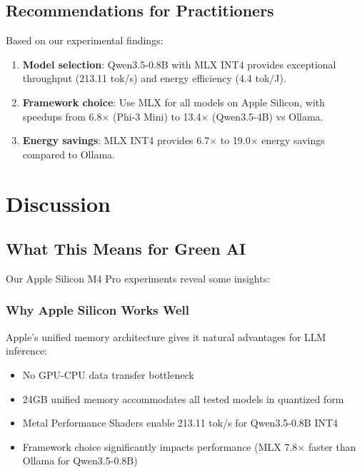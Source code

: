 \documentclass[conference]{IEEEtran}
\begin{document}
\subsection{Recommendations for Practitioners}

Based on our experimental findings:

\begin{enumerate}[leftmargin=*,nosep]
    \item \textbf{Model selection}: Qwen3.5-0.8B with MLX INT4 provides exceptional throughput (213.11 tok/s) and energy efficiency (4.4 tok/J).

    \item \textbf{Framework choice}: Use MLX for all models on Apple Silicon, with speedups from 6.8$\times$ (Phi-3 Mini) to 13.4$\times$ (Qwen3.5-4B) vs Ollama.

    \item \textbf{Energy savings}: MLX INT4 provides 6.7$\times$ to 19.0$\times$ energy savings compared to Ollama.
\end{enumerate}

\section{Discussion}

\subsection{What This Means for Green AI}

Our Apple Silicon M4 Pro experiments reveal some insights:

\subsubsection{Why Apple Silicon Works Well}

Apple's unified memory architecture gives it natural advantages for LLM inference:

\begin{itemize}[leftmargin=*,nosep]
    \item No GPU-CPU data transfer bottleneck
    \item 24GB unified memory accommodates all tested models in quantized form
    \item Metal Performance Shaders enable 213.11 tok/s for Qwen3.5-0.8B INT4
    \item Framework choice significantly impacts performance (MLX 7.8$\times$ faster than Ollama for Qwen3.5-0.8B)
\end{itemize}
\end{document}
